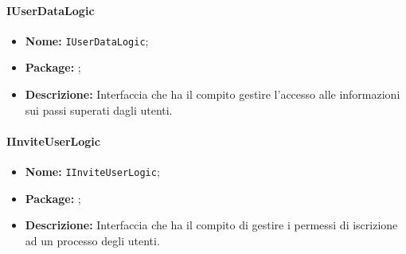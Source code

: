 \paragraph{IUserDataLogic}
\begin{itemize}
\item \textbf{Nome:} \texttt{IUserDataLogic};
\item \textbf{Package:} \texttt{\iLogicAdmin{}};
\item \textbf{Descrizione:} Interfaccia che ha il compito gestire l'accesso alle informazioni sui passi superati dagli utenti.
\end{itemize}


\paragraph{IInviteUserLogic}
\begin{itemize}
\item \textbf{Nome:} \texttt{IInviteUserLogic};
\item \textbf{Package:} \texttt{\iLogicAdmin{}};
\item \textbf{Descrizione:} Interfaccia che ha il compito di gestire i permessi di iscrizione ad un processo degli utenti.
\end{itemize}
